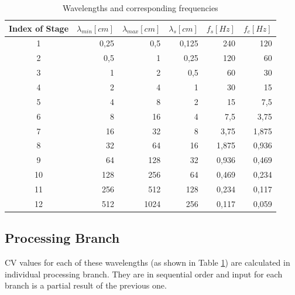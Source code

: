 \documentclass[twoside]{ctuthesis}
\theoremstyle{plain}
\theoremstyle{definition}
\theoremstyle{note}
\begin{document}
\begin{table}[htbp]
	\centering
	\caption{Wavelengths and corresponding frequencies}
	\begin{tabular}{crrrrr}
		\toprule
		Index of Stage & $\lambda_{min} [cm]$ & $\lambda_{max} [cm]$ & $\lambda_{s} [cm]$ & $f_s [Hz]$ & $f_c [Hz]$ \\
		\midrule
		1     & 0,25  & 0,5   & 0,125 & 240   & 120 \\
		2     & 0,5   & 1     & 0,25  & 120   & 60 \\
		3     & 1     & 2     & 0,5   & 60    & 30 \\
		4     & 2     & 4     & 1     & 30    & 15 \\
		5     & 4     & 8     & 2     & 15    & 7,5 \\
		6     & 8     & 16    & 4     & 7,5   & 3,75 \\
		7     & 16    & 32    & 8     & 3,75  & 1,875 \\
		8     & 32    & 64    & 16    & 1,875 & 0,936 \\
		9     & 64    & 128   & 32    & 0,936 & 0,469 \\
		10    & 128   & 256   & 64    & 0,469 & 0,234 \\
		11    & 256   & 512   & 128   & 0,234 & 0,117\\
		12    & 512   & 1024  & 256   & 0,117 & 0,059 \\
		
		\bottomrule
	\end{tabular}%
	\label{tab:Wavelengths}%
\end{table}%

\subsection{Processing Branch}
\label{processingBranch_sliver}
CV values for each of these wavelengths (as shown in Table \ref{tab:Wavelengths}) are calculated in individual processing branch. They are in sequential order and input for each branch is a partial result of the previous one.
\end{document}

